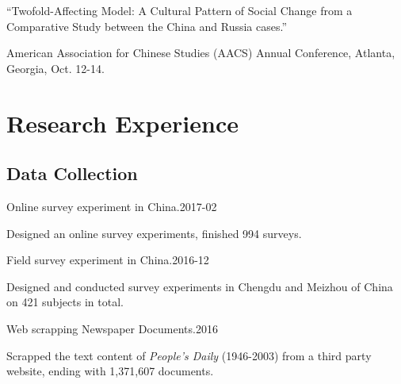 \documentclass[10.5pt,]{article}
\providecommand{\tightlist}{%
  \setlength{\itemsep}{0pt}\setlength{\parskip}{0pt}}
\renewenvironment{itemize}{
  \begin{list}{}{
    \setlength{\leftmargin}{1.5em}
  }
}{
  \end{list}
}
\begin{document}
\begin{itemize}
  \begin{itemize}
  \tightlist
  \item
    ``Twofold-Affecting Model: A Cultural Pattern of Social Change from
    a Comparative Study between the China and Russia cases.''

    \begin{itemize}
    \tightlist
    \item
      \footnotesize American Association for Chinese Studies (AACS)
      Annual Conference, Atlanta, Georgia, Oct. 12-14.
    \end{itemize}
  \end{itemize}
\end{itemize}

\section{Research Experience}\label{research-experience}

\subsection{Data Collection}\label{data-collection}

\begin{itemize}
\tightlist
\item
  Online survey experiment in China.\hfill 2017-02

  \begin{itemize}
  \tightlist
  \item
    \footnotesize Designed an online survey experiments, finished 994
    surveys.
  \end{itemize}
\item
  Field survey experiment in China.\hfill 2016-12

  \begin{itemize}
  \tightlist
  \item
    \footnotesize Designed and conducted survey experiments in Chengdu
    and Meizhou of China on 421 subjects in total.
  \end{itemize}
\item
  Web scrapping Newspaper Documents.\hfill 2016

  \begin{itemize}
  \tightlist
  \item
    \footnotesize Scrapped the text content of \emph{People's Daily}
    (1946-2003) from a third party website, ending with 1,371,607
    documents.
  \end{itemize}
\end{itemize}
\end{document}
